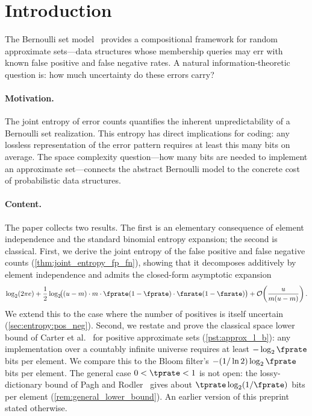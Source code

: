 \section{Introduction}
\label{sec:intro_ent}

The Bernoulli set model~\cite{bernoulliSets} provides a compositional framework
for random approximate sets---data structures whose membership queries may err
with known false positive and false negative rates.
A natural information-theoretic question is: how much uncertainty do these
errors carry?

\paragraph{Motivation.}
The joint entropy of error counts quantifies the inherent unpredictability of a
Bernoulli set realization.
This entropy has direct implications for coding: any lossless representation of
the error pattern requires at least this many bits on average.
The space complexity question---how many bits are needed to implement an
approximate set---connects the abstract Bernoulli model to the concrete cost of
probabilistic data structures.

\paragraph{Content.}
The paper collects two results.
The first is an elementary consequence of element independence and the
standard binomial entropy expansion; the second is classical.
First, we derive the joint entropy of the false positive and false negative
counts (\cref{thm:joint_entropy_fp_fn}), showing that it decomposes additively
by element independence and admits the closed-form asymptotic expansion
\begin{equation}
    \log_2(2\pi e)
    + \frac{1}{2}\log_2\!\bigl(
        (u-m) \cdot m \cdot \fprate(1-\fprate) \cdot \fnrate(1-\fnrate)
      \bigr)
    + \mathcal{O}\!\left(\frac{u}{m(u-m)}\right).
\end{equation}
We extend this to the case where the number of positives is itself uncertain
(\cref{sec:entropy:pos_neg}).
Second, we restate and prove the classical space lower bound of Carter et
al.~\cite{carterExact} for positive approximate sets
(\cref{pst:approx_l_b}): any implementation over a countably infinite universe
requires at least $-\log_2 \fprate$ bits per element.
We compare this to the Bloom filter's $-(1/\ln 2)\log_2\fprate$ bits per
element.
The general case $0 < \tprate < 1$ is not open: the lossy-dictionary bound of
Pagh and Rodler~\cite{paghRodlerLossy} gives about $\tprate\log_2(1/\fprate)$
bits per element (\cref{rem:general_lower_bound}).
An earlier version of this preprint stated otherwise.

